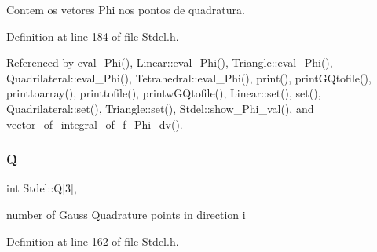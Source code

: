 Contem os vetores Phi nos pontos de quadratura. 



Definition at line 184 of file Stdel.\+h.



Referenced by eval\+\_\+\+Phi(), Linear\+::eval\+\_\+\+Phi(), Triangle\+::eval\+\_\+\+Phi(), Quadrilateral\+::eval\+\_\+\+Phi(), Tetrahedral\+::eval\+\_\+\+Phi(), print(), print\+G\+Qtofile(), printtoarray(), printtofile(), printw\+G\+Qtofile(), Linear\+::set(), set(), Quadrilateral\+::set(), Triangle\+::set(), Stdel\+::show\+\_\+\+Phi\+\_\+val(), and vector\+\_\+of\+\_\+integral\+\_\+of\+\_\+f\+\_\+\+Phi\+\_\+dv().

\mbox{\label{classStdel_a82074e598ad5af5ec45a3257a3c2b684}} 
\subsubsection{\texorpdfstring{Q}{Q}}
{\footnotesize\ttfamily int Stdel\+::Q\mbox{[}3\mbox{]}\hspace{0.3cm}{\ttfamily [protected]}, {\ttfamily [inherited]}}



number of Gauss Quadrature points in direction i 



Definition at line 162 of file Stdel.\+h.



